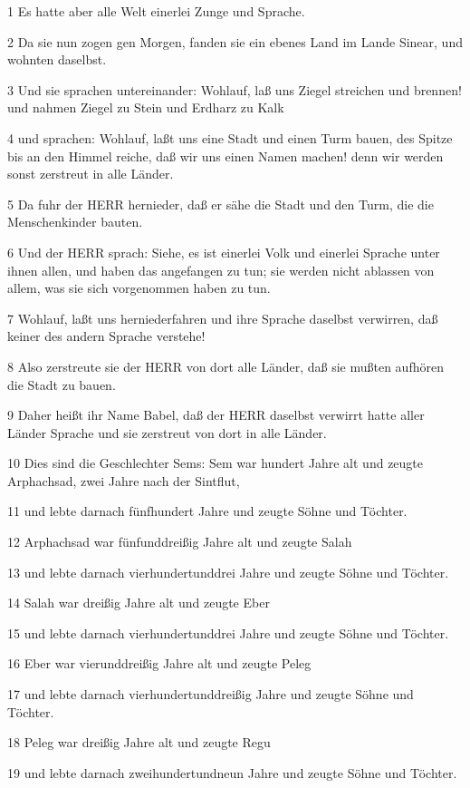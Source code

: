 \par 1 Es hatte aber alle Welt einerlei Zunge und Sprache.
\par 2 Da sie nun zogen gen Morgen, fanden sie ein ebenes Land im Lande Sinear, und wohnten daselbst.
\par 3 Und sie sprachen untereinander: Wohlauf, laß uns Ziegel streichen und brennen! und nahmen Ziegel zu Stein und Erdharz zu Kalk
\par 4 und sprachen: Wohlauf, laßt uns eine Stadt und einen Turm bauen, des Spitze bis an den Himmel reiche, daß wir uns einen Namen machen! denn wir werden sonst zerstreut in alle Länder.
\par 5 Da fuhr der HERR hernieder, daß er sähe die Stadt und den Turm, die die Menschenkinder bauten.
\par 6 Und der HERR sprach: Siehe, es ist einerlei Volk und einerlei Sprache unter ihnen allen, und haben das angefangen zu tun; sie werden nicht ablassen von allem, was sie sich vorgenommen haben zu tun.
\par 7 Wohlauf, laßt uns herniederfahren und ihre Sprache daselbst verwirren, daß keiner des andern Sprache verstehe!
\par 8 Also zerstreute sie der HERR von dort alle Länder, daß sie mußten aufhören die Stadt zu bauen.
\par 9 Daher heißt ihr Name Babel, daß der HERR daselbst verwirrt hatte aller Länder Sprache und sie zerstreut von dort in alle Länder.
\par 10 Dies sind die Geschlechter Sems: Sem war hundert Jahre alt und zeugte Arphachsad, zwei Jahre nach der Sintflut,
\par 11 und lebte darnach fünfhundert Jahre und zeugte Söhne und Töchter.
\par 12 Arphachsad war fünfunddreißig Jahre alt und zeugte Salah
\par 13 und lebte darnach vierhundertunddrei Jahre und zeugte Söhne und Töchter.
\par 14 Salah war dreißig Jahre alt und zeugte Eber
\par 15 und lebte darnach vierhundertunddrei Jahre und zeugte Söhne und Töchter.
\par 16 Eber war vierunddreißig Jahre alt und zeugte Peleg
\par 17 und lebte darnach vierhundertunddreißig Jahre und zeugte Söhne und Töchter.
\par 18 Peleg war dreißig Jahre alt und zeugte Regu
\par 19 und lebte darnach zweihundertundneun Jahre und zeugte Söhne und Töchter.
